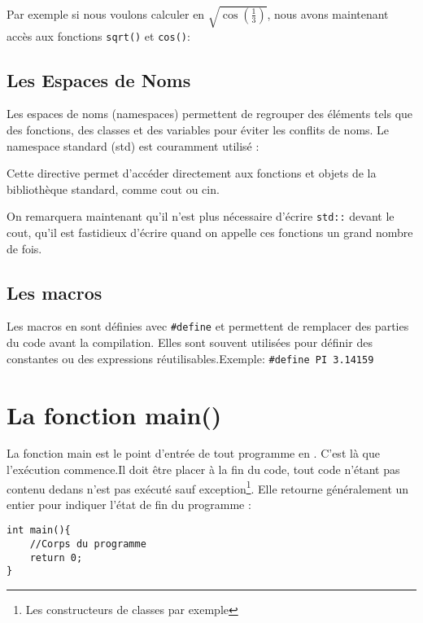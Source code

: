 Par exemple si nous voulons calculer en \cpp $\sqrt{\cos(\frac{1}{3})}$, nous avons maintenant accès aux fonctions \lstinline|sqrt()| et \lstinline|cos()|:



\subsection{Les Espaces de Noms}

Les espaces de noms (namespaces) permettent de regrouper des éléments tels que des fonctions, des classes et des variables pour éviter les conflits de noms. Le namespace standard (std) est couramment utilisé :



Cette directive permet d'accéder directement aux fonctions et objets de la bibliothèque standard, comme cout ou cin.



On remarquera maintenant qu'il n'est plus nécessaire d'écrire \lstinline|std::| devant le cout, qu'il est fastidieux d'écrire quand on appelle ces fonctions un grand nombre de fois.

\subsection{Les macros}

Les macros en \cpp sont définies avec \lstinline|#define| et permettent de remplacer des parties du code avant la compilation. Elles sont souvent utilisées pour définir des constantes ou des expressions réutilisables.Exemple:
\lstinline|#define PI 3.14159|

\section{La fonction main()} 

La fonction main est le point d’entrée de tout programme en \cpp. C’est là que l’exécution commence.Il doit être placer à la fin du code, tout code n'étant pas contenu dedans n'est pas exécuté sauf exception\footnote{Les constructeurs de classes par exemple}. Elle retourne généralement un entier pour indiquer l’état de fin du programme :

\begin{lstlisting}
int main(){
	//Corps du programme
	return 0;
}
\end{lstlisting}

